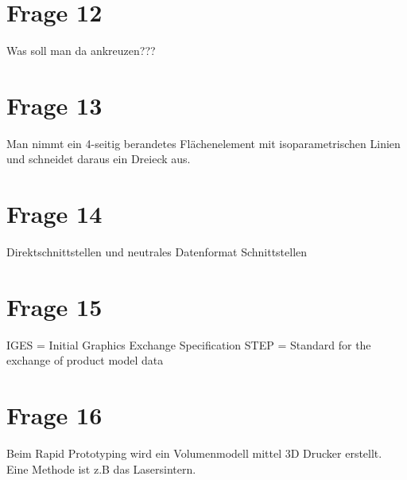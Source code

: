 \section{Frage 12}

Was soll man da ankreuzen???


\section{Frage 13}

Man nimmt ein 4-seitig berandetes Flächenelement mit isoparametrischen Linien und schneidet daraus ein Dreieck aus.

\section{Frage 14}

Direktschnittstellen und neutrales Datenformat Schnittstellen

\section{Frage 15}

IGES = Initial Graphics Exchange Specification
STEP = Standard for the exchange of product model data

\section{Frage 16}

Beim Rapid Prototyping wird ein Volumenmodell mittel 3D Drucker erstellt. Eine Methode ist z.B das Lasersintern.





